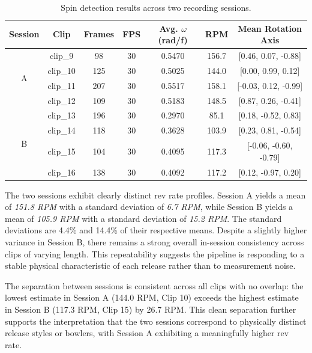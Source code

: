 \begin{table}[htbp]
\centering
    \caption{Spin detection results across two recording sessions.}
    \label{tab:spin_results}
    \small
    \setlength{\tabcolsep}{4pt}
    \begin{tabular}{ccccccc}
    \toprule
    \textbf{Session} & \textbf{Clip} & \textbf{Frames} & \textbf{FPS} & \textbf{Avg. $\omega$ (rad/f)} & \textbf{RPM} & \textbf{Mean Rotation Axis} \\
    \midrule
    \multirow{4}{*}{A} & clip\_9  & 98  & 30 & 0.5470 & 156.7 & [0.46, 0.07, -0.88] \\
                    & clip\_10 & 125 & 30 & 0.5025 & 144.0 & [0.00, 0.99, 0.12] \\
                    & clip\_11 & 207 & 30 & 0.5517 & 158.1 & [-0.03, 0.12, -0.99] \\
                    & clip\_12 & 109 & 30 & 0.5183 & 148.5 & [0.87, 0.26, -0.41] \\
    \midrule
    \multirow{4}{*}{B} & clip\_13 & 196 & 30 & 0.2970 & 85.1 & [0.18, -0.52, 0.83] \\
                    & clip\_14 & 118 & 30 & 0.3628 & 103.9 & [0.23, 0.81, -0.54] \\
                    & clip\_15 & 104 & 30 & 0.4095 & 117.3 & [-0.06, -0.60, -0.79] \\
                    & clip\_16 & 138 & 30 & 0.4092 & 117.2 & [0.12, -0.97, 0.20] \\
    \bottomrule
    \end{tabular}%
\end{table}

The two sessions exhibit clearly distinct rev rate profiles. Session A yields a mean of \emph{151.8 RPM} with a standard deviation of \emph{6.7 RPM}, while Session B yields a mean of \emph{105.9 RPM} with a standard deviation of \emph{15.2 RPM}. The standard deviations are 4.4\% and 14.4\% of their respective means. Despite a slightly higher variance in Session B, there remains a strong overall in-session consistency across clips of varying length. This repeatability suggests the pipeline is responding to a stable physical characteristic of each release rather than to measurement noise.

The separation between sessions is consistent across all clips with no overlap: the lowest estimate in Session A (144.0 RPM, Clip 10) exceeds the highest estimate in Session B (117.3 RPM, Clip 15) by 26.7 RPM. This clean separation further supports the interpretation that the two sessions correspond to physically distinct release styles or bowlers, with Session A exhibiting a meaningfully higher rev rate.

